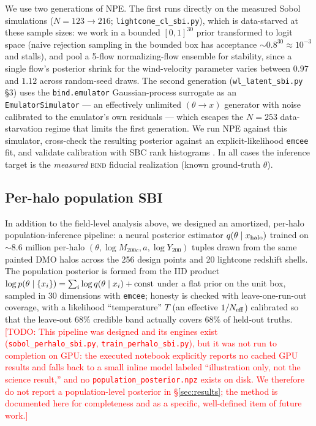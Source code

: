 \documentclass[11pt]{article}
\newcommand{\bind}{\textsc{bind}}
\newcommand{\Mhalo}{M_{200c}}
\newcommand{\todo}[1]{\textcolor{red}{[TODO: #1]}}
\begin{document}
We use two generations of NPE. The first runs directly on the measured
Sobol simulations ($N=123\to216$; \texttt{lightcone\_cl\_sbi.py}), which
is data-starved at these sample sizes: we work in a bounded $[0,1]^{30}$
prior transformed to logit space (naive rejection sampling in the bounded
box has acceptance $\sim0.8^{30}\approx10^{-3}$ and stalls), and pool a
5-flow normalizing-flow ensemble for stability, since a single flow's
posterior shrink for the wind-velocity parameter varies between $0.97$ and
$1.12$ across random-seed draws. %
The second generation (\texttt{wl\_latent\_sbi.py} \S3) uses the
\texttt{bind.emulator} Gaussian-process surrogate as an
\texttt{EmulatorSimulator} — an effectively unlimited $(\theta\to x)$
generator with noise calibrated to the emulator's own residuals — which
escapes the $N=253$ data-starvation regime that limits the first
generation. We run NPE against this simulator, cross-check the resulting
posterior against an explicit-likelihood \texttt{emcee} fit, and validate
calibration with SBC rank histograms \citep{Talts2018SBC}. In all cases
the inference target is the \emph{measured} \bind{} fiducial realization
(known ground-truth $\theta$). %

\subsection{Per-halo population SBI}\label{sec:methods-perhalo}

In addition to the field-level analysis above, we designed an
amortized, per-halo population-inference pipeline: a neural posterior
estimator $q(\theta \mid x_{\rm halo})$ trained on $\sim\!8.6$ million
per-halo $(\theta, \log \Mhalo, a, \log Y_{200})$ tuples drawn from the
same painted DMO halos across the 256 design points and 20 lightcone
redshift shells. %
The population posterior is formed from the IID product
$\log p(\theta \mid \{x_i\}) = \sum_i \log q(\theta \mid x_i) + {\rm
const}$ under a flat prior on the unit box, sampled in 30 dimensions with
\texttt{emcee}; honesty is checked with leave-one-run-out coverage, with a
likelihood ``temperature'' $T$ (an effective $1/N_{\rm eff}$) calibrated
so that the leave-out $68\%$ credible band actually covers $68\%$ of
held-out truths. %
\todo{This pipeline was designed and its engines exist
(\texttt{sobol\_perhalo\_sbi.py}, \texttt{train\_perhalo\_sbi.py}), but it
was not run to completion on GPU: the executed notebook explicitly reports
no cached GPU results and falls back to a small inline model labeled
``illustration only, not the science result,'' and no
\texttt{population\_posterior.npz} exists on disk. We therefore do not
report a population-level posterior in \S\ref{sec:results}; the method is
documented here for completeness and as a specific, well-defined item of
future work.}
\end{document}
